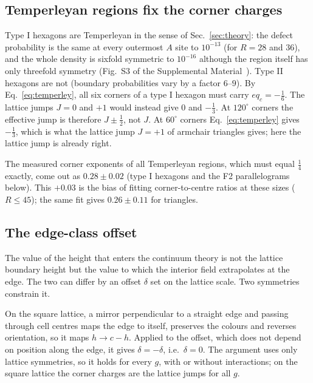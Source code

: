 \documentclass[aps,pre,twocolumn,superscriptaddress,nofootinbib,floatfix]{revtex4-2}
\begin{document}
\subsection{Temperleyan regions fix the corner charges}
Type I hexagons are Temperleyan in the sense of Sec.~\ref{sec:theory}: the defect probability is the same at every outermost $A$ site to $10^{-13}$ (for $R=28$ and $36$), and the whole density is sixfold symmetric to $10^{-16}$ although the region itself has only threefold symmetry (Fig.~S3 of the Supplemental Material~\cite{SM}). Type II hexagons are not (boundary probabilities vary by a factor $6$--$9$). By Eq.~\eqref{eq:temperley}, all six corners of a type I hexagon must carry $eq_c=-\tfrac16$. The lattice jumps $J=0$ and $+1$ would instead give $0$ and $-\tfrac13$. At $120^\circ$ corners the effective jump is therefore $J\pm\tfrac12$, not $J$. At $60^\circ$ corners Eq.~\eqref{eq:temperley} gives $-\tfrac13$, which is what the lattice jump $J=+1$ of armchair triangles gives; here the lattice jump is already right.

The measured corner exponents of all Temperleyan regions, which must equal $\tfrac14$ exactly, come out as $0.28\pm0.02$ (type I hexagons and the F2 parallelograms below). This $+0.03$ is the bias of fitting corner-to-centre ratios at these sizes ($R\le45$); the same fit gives $0.26\pm0.11$ for triangles.

\subsection{The edge-class offset}
\label{sec:shift}
The value of the height that enters the continuum theory is not the lattice boundary height but the value to which the interior field extrapolates at the edge. The two can differ by an offset $\delta$ set on the lattice scale. Two symmetries constrain it.

On the square lattice, a mirror perpendicular to a straight edge and passing through cell centres maps the edge to itself, preserves the colours and reverses orientation, so it maps $h\to c-h$. Applied to the offset, which does not depend on position along the edge, it gives $\delta=-\delta$, i.e.\ $\delta=0$. The argument uses only lattice symmetries, so it holds for every $g$, with or without interactions; on the square lattice the corner charges are the lattice jumps for all $g$.
\end{document}
